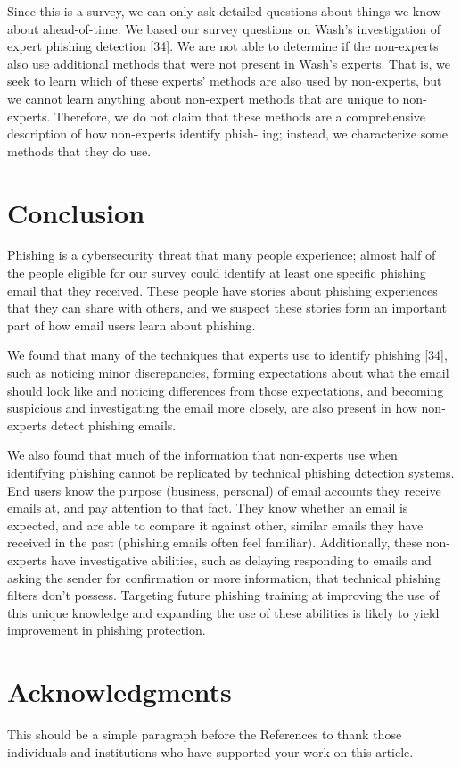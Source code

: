 \documentclass[lettersize,journal]{IEEEtran}
\begin{document}
Since this is a survey, we can only ask detailed questions about things we know
about ahead-of-time. We based our survey questions on Wash’s investigation of
expert phishing detection [34]. We are not able to determine if the non-experts
also use additional methods that were not present in Wash’s experts. That is,
we seek to learn which of these experts’ methods are also used by non-experts,
but we cannot learn anything about non-expert methods that are unique to non-
experts. Therefore, we do not claim that these methods are a comprehensive
description of how non-experts identify phish- ing; instead, we characterize
some methods that they do use.

\section{Conclusion}
Phishing is a cybersecurity threat that many people experience; almost half of
the people eligible for our survey could identify at least one specific
phishing email that they received. These people have stories about phishing
experiences that they can share with others, and we suspect these stories form
an important part of how email users learn about phishing.

We found that many of the techniques that experts use to identify phishing
  [34], such as noticing minor discrepancies, forming expectations about what the
email should look like and noticing differences from those expectations, and
becoming suspicious and investigating the email more closely, are also present
in how non-experts detect phishing emails.

We also found that much of the information that non-experts use when
identifying phishing cannot be replicated by technical phishing detection
systems. End users know the purpose (business, personal) of email accounts they
receive emails at, and pay attention to that fact. They know whether an email
is expected, and are able to compare it against other, similar emails they have
received in the past (phishing emails often feel familiar). Additionally, these
non-experts have investigative abilities, such as delaying responding to emails
and asking the sender for confirmation or more information, that technical
phishing filters don’t possess. Targeting future phishing training at improving
the use of this unique knowledge and expanding the use of these abilities is
likely to yield improvement in phishing protection.

\section*{Acknowledgments}
This should be a simple paragraph before the References to thank those individuals and institutions who have supported your work on this article.
\end{document}
